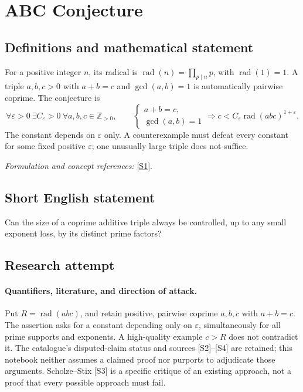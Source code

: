 \documentclass[11pt]{article}
\begin{document}
\section*{\texorpdfstring{ABC Conjecture}{ABC Conjecture}}\label{statement}
\subsection{Definitions and mathematical statement}
For a positive integer $n$, its radical is $\operatorname{rad}(n)=\prod_{p\mid n}p$, with $\operatorname{rad}(1)=1$. A triple $a,b,c>0$ with $a+b=c$ and $\gcd(a,b)=1$ is automatically pairwise coprime. The conjecture is
\[
 \forall\varepsilon>0\ \exists C_\varepsilon>0\ \forall a,b,c\in{\mathbb{Z}}_{>0},\qquad
 \begin{cases}a+b=c,\\\gcd(a,b)=1\end{cases}
 \Longrightarrow c<C_\varepsilon\operatorname{rad}(abc)^{1+\varepsilon}.
\]
The constant depends on $\varepsilon$ only. A counterexample must defeat every constant for some fixed positive $\varepsilon$; one unusually large triple does not suffice.
\par\smallskip\textit{Formulation and concept references:} \href{https://link.springer.com/article/10.1007/s00025-026-02616-5}{[S1]}.

\subsection{Short English statement}
Can the size of a coprime additive triple always be controlled, up to any small exponent loss, by its distinct prime factors?
\subsection{Research attempt}

\paragraph{Quantifiers, literature, and direction of attack.}
Put $R=\operatorname{rad}(abc)$, and retain positive, pairwise coprime
$a,b,c$ with $a+b=c$. The assertion asks for a constant depending only
on $\varepsilon$, simultaneously for all prime supports and exponents.
A high-quality example $c>R$ does not contradict it. The catalogue's
disputed-claim status and sources [S2]--[S4] are retained; this notebook
neither assumes a claimed proof nor purports to adjudicate those arguments.
Scholze--Stix [S3] is a specific critique of an existing approach, not a
proof that every possible approach must fail.
\end{document}
